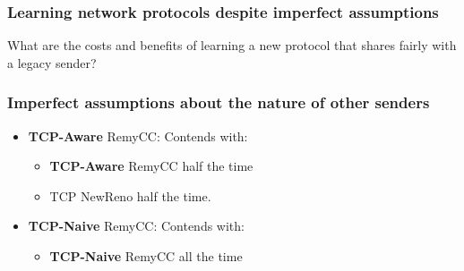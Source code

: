\begin{frame}
\frametitle{Learning network protocols despite imperfect assumptions}
\begin{centering}
What are the costs and benefits of learning a new protocol that shares fairly with a legacy sender?
\end{centering}
\end{frame}

\begin{frame}
\frametitle{Imperfect assumptions about the nature of other senders}
\begin{itemize}
\item<1-> \textbf{TCP-Aware} RemyCC: Contends with:
 \begin{itemize}
 \item \textbf{TCP-Aware} RemyCC half the time
 \item TCP NewReno half the time.
 \end{itemize}
\item<2-> \textbf{TCP-Naive} RemyCC: Contends with:
 \begin{itemize}
 \item \textbf{TCP-Naive} RemyCC all the time
 \end{itemize}
\end{itemize}
\end{frame}

